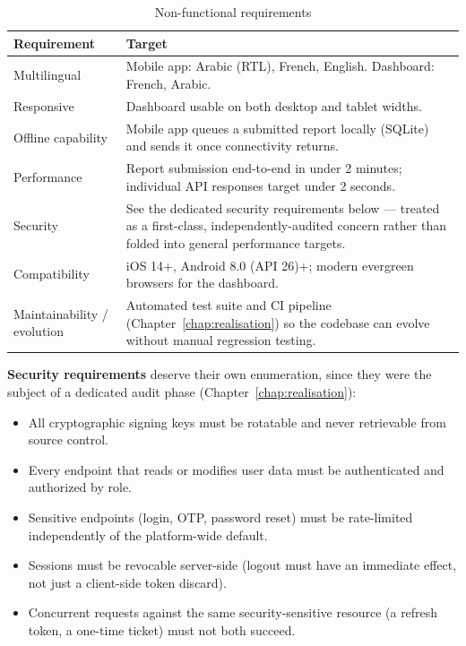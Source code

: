 \begin{table}[h!]
\centering
\begin{tabularx}{\textwidth}{lX}
\toprule
\textbf{Requirement} & \textbf{Target} \\
\midrule
Multilingual        & Mobile app: Arabic (RTL), French, English. Dashboard: French, Arabic. \\
Responsive           & Dashboard usable on both desktop and tablet widths. \\
Offline capability   & Mobile app queues a submitted report locally (SQLite) and sends it once connectivity returns. \\
Performance          & Report submission end-to-end in under 2 minutes; individual API responses target under 2 seconds. \\
Security             & See the dedicated security requirements below --- treated as a first-class, independently-audited concern rather than folded into general performance targets. \\
Compatibility        & iOS 14+, Android 8.0 (API 26)+; modern evergreen browsers for the dashboard. \\
Maintainability / evolution & Automated test suite and CI pipeline (Chapter~\ref{chap:realisation}) so the codebase can evolve without manual regression testing. \\
\bottomrule
\end{tabularx}
\caption{Non-functional requirements}
\label{tab:nfr}
\end{table}

\textbf{Security requirements} deserve their own enumeration, since they were the subject of a dedicated audit phase (Chapter~\ref{chap:realisation}):
\begin{itemize}[leftmargin=*]
  \item All cryptographic signing keys must be rotatable and never retrievable from source control.
  \item Every endpoint that reads or modifies user data must be authenticated and authorized by role.
  \item Sensitive endpoints (login, OTP, password reset) must be rate-limited independently of the platform-wide default.
  \item Sessions must be revocable server-side (logout must have an immediate effect, not just a client-side token discard).
  \item Concurrent requests against the same security-sensitive resource (a refresh token, a one-time ticket) must not both succeed.

\end{itemize}

